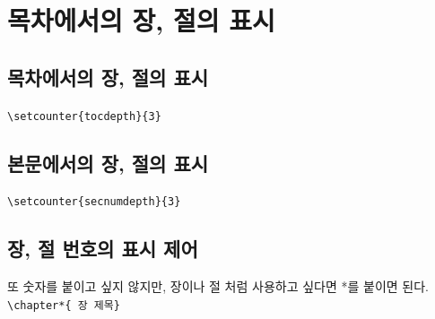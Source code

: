 \documentclass[12pt, a4paper, oneside]{book}
\let\stdsection\section
\renewcommand\section{\newpage\stdsection}
\begin{document}
	\newpage
	\section{목차에서의 장, 절의 표시}


		\subsection{목차에서의 장, 절의 표시}

			\verb|\setcounter{tocdepth}{3}|\\



		\subsection{본문에서의 장, 절의 표시}

			\verb|\setcounter{secnumdepth}{3}|\\
	
	
			\begin{table}[hbp]
			\caption{장, 절 수준 및 번호}
			\centering 


			\end{table}

		\newpage  \null
		\subsection{장, 절  번호의  표시 제어}
	
			또 숫자를 붙이고 싶지 않지만, 장이나 절 처럼 사용하고 싶다면 *를 붙이면 된다.\\

			\verb|\chapter*{ 장 제목}|\\
\end{document}
